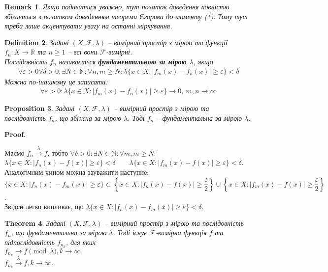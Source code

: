 \documentclass[a4paper, 10pt]{article}
\makeatletter
\theoremstyle{theoremdd}
\newtheorem{theorem}{Theorem}[subsection]
\newtheorem{definition}[theorem]{Definition}
\newtheorem{proposition}[theorem]{Proposition}
\newtheorem{remark}[theorem]{Remark}
\newcommand\tomeasure[1]{\overset{{#1}}{\to}}
\renewenvironment{proof}[1][Proof.\\]{\par
\pushQED{\hfill \qed}%
\normalfont \topsep6\p@\@plus6\p@\relax
\trivlist
\item\relax
{\bfseries
#1\@addpunct{.}}\hspace\labelsep\ignorespaces
}{%
\popQED\endtrivlist\@endpefalse
}
\makeatother
\begin{document}
\begin{remark}
Якщо подивитися уважно, тут початок доведення повністю збігається з початком доведенням теореми Єгорова до моменту (*). Тому тут треба лише акцентувати увагу на останні міркування.
\end{remark}

\begin{definition}
Задані $(X,\mathcal{F},\lambda)$ -- вимірний простір з мірою та функції $f_n \colon X \to \mathbb{R}$ та $n \geq 1$ -- всі вони $\mathcal{F}$-вимірні.\\
Послідовність $f_n$ називається \textbf{фундаментальною за мірою $\lambda$}, якщо
\begin{align*}
\forall \varepsilon > 0 \forall \delta > 0: \exists N \in \mathbb{N}: \forall n,m \geq N: \lambda \{ x \in X: |f_m(x) - f_n(x)| \geq \varepsilon\} < \delta
\end{align*}
Можна по-інашкому це записати:
\begin{align*}
\forall \varepsilon > 0: \lambda\{ x \in X: |f_m(x)-f_n(x)| \geq \varepsilon \} \to 0,\ m,n \to \infty
\end{align*}
\end{definition}

\begin{proposition}
Задані $(X,\mathcal{F},\lambda)$ -- вимірний простір з мірою та послідовність $f_n$, що збіжна за мірою $\lambda$. Тоді $f_n$ -- фундаментальна за мірою $\lambda$.
\end{proposition}

\begin{proof}
Маємо $f_n \tomeasure{\lambda} f$, тобто $\forall \delta > 0: \exists N \in \mathbb{N}: \forall m,m \geq N:$\\
$\lambda\{x \in X: |f_n(x) - f(x)| \geq \varepsilon\} < \delta \qquad \lambda\{x \in X: |f_m(x) - f(x)| \geq \varepsilon\} < \delta$.\\
Аналогічним чином можна зауважити наступне:\\
$\{x \in X: |f_n(x) - f_m(x)| \geq \varepsilon \} \subset \left\{ x \in X: |f_n(x) - f(x)| \geq \dfrac{\varepsilon}{2} \right\} \cup \left\{ x \in X: |f_m(x) - f(x)| \geq \dfrac{\varepsilon}{2} \right\}$.\\
Звідси легко випливає, що $\lambda\{x \in X: |f_n(x) - f_m(x)| \geq \varepsilon\} < \delta$.
\end{proof}

\begin{theorem}
\label{from_Cauchy_with_measure_implies_convergence}
Задані $(X,\mathcal{F},\lambda)$ -- вимірний простір з мірою та послідовність $f_n$, що фундаментальна за мірою $\lambda$. Тоді існує $\mathcal{F}$-вимірна функція $f$ та підпослідовність $f_{n_k}$, для яких\\
$f_{n_k} \to f \pmod {\lambda}, k \to \infty$\\
$f_{n_k} \tomeasure{\lambda} f, k \to \infty$.
\end{theorem}
\end{document}
